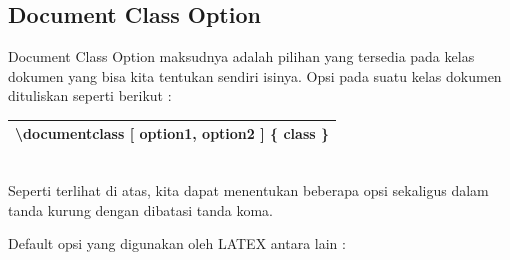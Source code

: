 \subsection{Document Class Option}
Document Class Option maksudnya adalah pilihan yang tersedia pada kelas dokumen yang bisa kita tentukan sendiri isinya. Opsi pada suatu kelas dokumen dituliskan seperti berikut :\\[0.5 cm]
\begin{tabular}{|p{13.5 cm}|}
\hline
          \textbackslash documentclass [ option1, option2 ] \{ class \}\\
\hline
\end{tabular}\\[0.5 cm]
Seperti terlihat di atas, kita dapat menentukan beberapa opsi sekaligus dalam tanda kurung dengan dibatasi tanda koma.\\[0.5 cm]

\begin{raggedleft}Default opsi yang digunakan oleh LATEX antara lain :\end{raggedleft}

